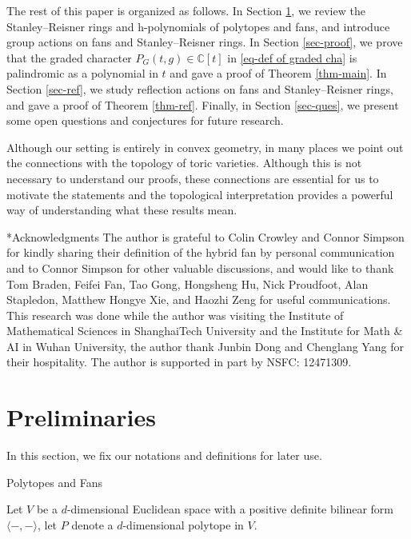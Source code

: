 \documentclass{amsart}
\makeatletter
\def\subsection{\@startsection{subsection}{2}
  \z@{.5\linespacing\@plus.7\linespacing}{.5\linespacing}
  {\normalfont\bfseries}}
\theoremstyle{definition}
\theoremstyle{remark}
\numberwithin{equation}{section}
\makeatother
\begin{document}
The rest of this paper is organized as follows. In Section \ref{sec-pre}, we review the Stanley--Reisner rings and h-polynomials of polytopes and fans, and introduce group actions on fans and Stanley--Reisner rings. In Section \ref{sec-proof}, we prove that the graded character $
P_G(t, g)\in \mathbb{C}[t]$ in \eqref{eq-def of graded cha} is palindromic as a polynomial in $t$ and gave a proof of Theorem \ref{thm-main}. In Section \ref{sec-ref}, we study reflection actions on fans and Stanley--Reisner rings, and gave a proof of Theorem \ref{thm-ref}. Finally, in Section \ref{sec-ques}, we present some open questions and conjectures for future research.

Although our setting is  entirely in convex geometry,
in many places we point out the connections with the topology of toric varieties.
Although this is not necessary to understand our proofs, these connections are essential for us to motivate the
statements and the topological interpretation  provides a powerful way of understanding what these results
mean.

\subsection*{Acknowledgments}
The author is grateful to Colin Crowley and Connor Simpson for kindly sharing their definition of the hybrid fan by personal communication and to Connor Simpson for other valuable discussions, and would like to thank Tom Braden, Feifei Fan, Tao Gong, Hongsheng Hu, Nick Proudfoot, Alan Stapledon, Matthew Hongye Xie, and Haozhi Zeng for useful communications. This research was done while the author was
visiting the Institute of Mathematical Sciences in ShanghaiTech University and the Institute for Math \& AI in Wuhan University, the author thank Junbin Dong and Chenglang Yang for their hospitality. The author is supported in part by NSFC: 12471309.

\section{Preliminaries} \label{sec-pre}

In this section, we fix our notations and definitions for later use.

\subsection{Polytopes and Fans}

Let $V$ be a $d$-dimensional Euclidean space with a positive definite bilinear form $\langle-,-\rangle$, let $P$ denote a $d$-dimensional polytope in $V$. 
\end{document}
